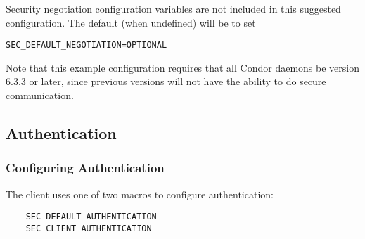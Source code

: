 Security negotiation configuration variables are not included in this
suggested configuration.
The default (when undefined) will be to set
\begin{verbatim}
SEC_DEFAULT_NEGOTIATION=OPTIONAL
\end{verbatim}

Note that this example configuration requires that all Condor daemons be
version 6.3.3 or later, since previous versions will not have
the ability to do secure communication.

\subsection{\label{sec:Security-Authentication}Authentication}

\subsubsection{Configuring Authentication}

The client uses one of two macros to configure authentication:
\begin{verbatim}
    SEC_DEFAULT_AUTHENTICATION
    SEC_CLIENT_AUTHENTICATION
\end{verbatim}


